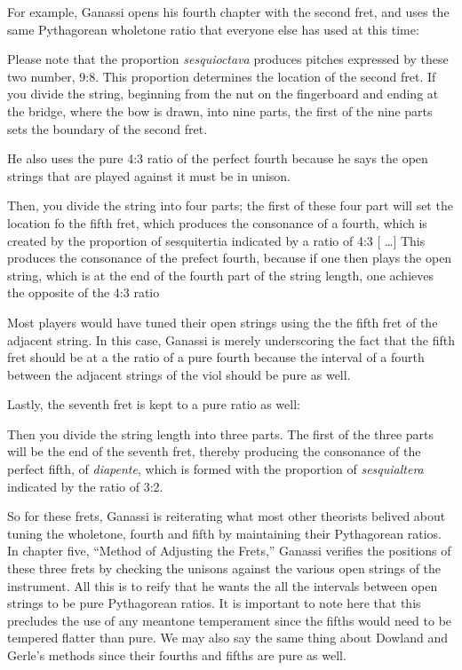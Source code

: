 For example, Ganassi opens his fourth chapter with the second fret, and uses the same
Pythagorean wholetone ratio that everyone else has used at this time:

\begin{blocks}
Please note that the proportion \emph{sesquioctava} produces pitches expressed
by these two number, 9:8.  This proportion determines the location of the second
fret.  If you divide the string, beginning from the nut on the fingerboard and
ending at the bridge, where the bow is drawn, into nine parts, the first of the
nine parts sets the boundary of the second fret.
\end{blocks}

He also uses the pure 4:3 ratio of the
perfect fourth because he says the open strings that are played against it must
be in unison.

\begin{blocks}
Then, you divide the string into four parts; the first of these four part will
set the location fo the fifth fret, which produces the consonance of a fourth,
which is created by the proportion of sesquitertia indicated by a ratio of 4:3
[ \ldots ] This produces the consonance of the prefect fourth, because if
one then plays the open string, which is at the end of the fourth part of the
string length, one achieves the opposite of the 4:3 ratio
\end{blocks}

Most players would have tuned their open strings using the the fifth fret of the
adjacent string.  In this case, Ganassi is merely underscoring the fact that the
fifth fret should be at a the ratio of a pure fourth because the interval of a fourth
between the adjacent strings of the viol should be pure as well.

Lastly, the seventh fret is kept to a pure ratio as well:

\begin{blocks}
Then you divide the string length into three parts. The first of the three parts will be the
end of the seventh fret, thereby producing the consonance of the perfect fifth, of \textit{diapente},
which is formed with the proportion of \textit{sesquialtera} indicated by the ratio of 3:2.
\end{blocks}

So for these frets, Ganassi is reiterating what most other theorists belived about tuning
the wholetone, fourth and fifth by maintaining their Pythagorean ratios.
In chapter five, ``Method of Adjusting the
Frets,'' Ganassi verifies the positions of these three frets by checking the unisons against
the various open strings of the instrument.  All this is to reify that he
wants the all the intervals between open strings to be pure Pythagorean ratios.  It is important
to note here that this precludes the use of any meantone temperament since the fifths would need
to be tempered flatter than pure.  We may also say the same thing about Dowland and Gerle's
methods since their fourths and fifths are pure as well.

